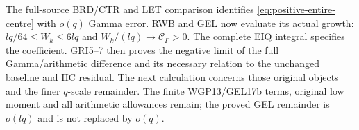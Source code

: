 The full-source BRD/CTR and LET comparison identifies
\eqref{eq:positive-entire-centre} with $o(q)$ Gamma error.
RWB and GEL now evaluate its actual growth:
$lq/64\leq W_k\leq6lq$ and $W_k/(lq)\to\mathcal C_\Gamma>0$.
The complete EIQ integral specifies the coefficient. GRI5--7
then proves the negative limit of the full Gamma/arithmetic
difference and its necessary relation to the unchanged baseline
and HC residual. The next calculation concerns those original
objects and the finer $q$-scale remainder. The finite WGP13/GEL17b
terms, original low moment and all arithmetic allowances remain;
the proved GEL remainder is $o(lq)$ and is not replaced by $o(q)$.